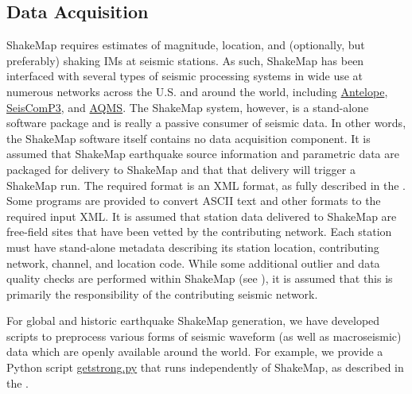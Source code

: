\documentclass[letterpaper,10pt,english]{sphinxmanual}
\begin{document}
\subsection{Data Acquisition}
\label{tg_parameters:data-acquisition}
ShakeMap requires estimates of magnitude, location, and (optionally, but preferably)
shaking IMs at seismic stations. As such, ShakeMap has been interfaced with
several types of seismic processing systems in wide use at numerous networks across the U.S. and
around the world, including \href{http://antelopeusersgroup.org/}{Antelope},
\href{https://www.seiscomp3.org/}{SeisComP3}, and \href{http://www.isti.com/products/aqms/}{AQMS}.
The ShakeMap system,
however, is a stand-alone software package and is really a passive consumer of seismic
data. In other words, the ShakeMap software itself contains no data acquisition component. It is
assumed that ShakeMap earthquake source information and parametric data are packaged
for delivery to ShakeMap and that that delivery will trigger a ShakeMap run. The
required format is an XML format, as fully described in the {\hyperref[software_guide:sm35\string-software\string-guide]{}}.
Some programs are provided to convert ASCII text and other formats to the required input
XML.
It is assumed that station data delivered to ShakeMap are free-field sites that have been
vetted by the contributing network. Each station must have stand-alone metadata
describing its station location, contributing network, channel, and location code. While some
additional outlier and data quality checks are performed within ShakeMap (see
{\hyperref[tg_processing:sec\string-shakemap\string-processing]{}}), it is assumed that this is primarily the
responsibility of the contributing seismic network.

For global and historic earthquake ShakeMap generation, we have developed scripts to
preprocess various forms of seismic waveform (as well as macroseismic) data which are
openly available around the world. For example, we provide a Python
script \href{https://github.com/mhearne-usgs/smtools}{getstrong.py}
that runs independently of ShakeMap, as described in the {\hyperref[software_guide:software\string-guide]{}}.
\end{document}
